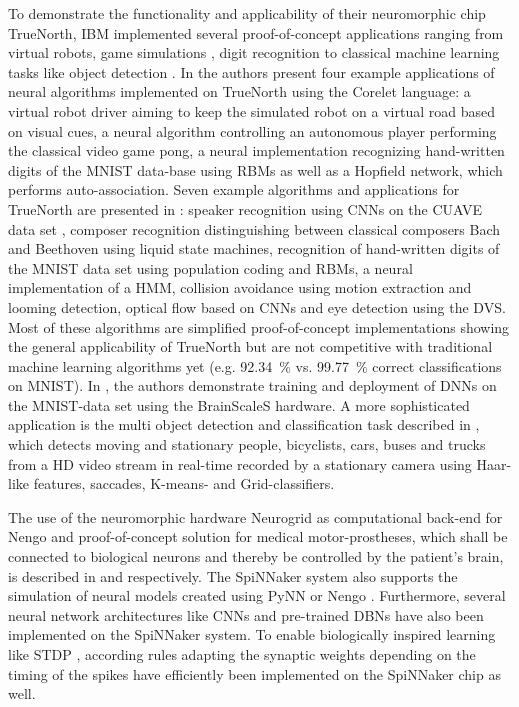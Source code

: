 To demonstrate the functionality and applicability of their neuromorphic chip TrueNorth, IBM implemented several proof-of-concept applications ranging from virtual robots, game simulations \cite{Arthur2012}, digit recognition \cite{Arthur2012, Esser2013} to classical machine learning tasks like object detection \cite{Akopyan2015}.
In \cite{Arthur2012} the authors present four example applications of neural algorithms implemented on TrueNorth using the Corelet language: a virtual robot driver aiming to keep the simulated robot on a virtual road based on visual cues, a neural algorithm controlling an autonomous player performing the classical video game pong, a neural implementation recognizing hand-written digits of the \ac{MNIST} data-base using \acp{RBM} as well as a Hopfield network, which performs auto-association.
Seven example algorithms and applications for TrueNorth are presented in \cite{Esser2013}: speaker recognition using \acp{CNN} on the \ac{CUAVE} data set \cite{Patterson2002}, composer recognition distinguishing between classical composers Bach and Beethoven using liquid state machines, recognition of hand-written digits of the \ac{MNIST} data set using population coding and \acp{RBM}, a neural implementation of a \ac{HMM}, collision avoidance using motion extraction and looming detection, optical flow based on \acp{CNN} and eye detection using the \ac{DVS}.
Most of these algorithms are simplified proof-of-concept implementations showing the general applicability of TrueNorth but are not competitive with traditional machine learning algorithms yet (e.g. \SI{92.34}{\percent} \cite{Esser2013} vs. \SI{99.77}{\percent} \cite{Ciresan2012a} correct classifications on \ac{MNIST}).
In \cite{Schmitt2017}, the authors demonstrate training and deployment of \acp{DNN} on the \ac{MNIST}-data set using the \ac{BrainScaleS} hardware.
A more sophisticated application is the multi object detection and classification task described in \cite{Akopyan2015}, which detects moving and stationary people, bicyclists, cars, buses and trucks from a HD video stream in real-time recorded by a stationary camera using Haar-like features, saccades, K-means- and Grid-classifiers.

The use of the neuromorphic hardware Neurogrid \cite{Benjamin2014} as computational back-end for \ac{Nengo} and proof-of-concept solution for medical motor-prostheses, which shall be connected to biological neurons and thereby be controlled by the patient's brain, is described in \cite{Choudhary2012} and \cite{Dethier2011} respectively.
The \ac{SpiNNaker} system \cite{Furber2014} also supports the simulation of neural models created using \ac{PyNN} or \ac{Nengo} \cite{Mundy2015}.
Furthermore, several neural network architectures like \acp{CNN} \cite{Serrano-Gotarredona2015} and pre-trained \acp{DBN} \cite{Stromatias2015, Stromatias2015a} have also been implemented on the \ac{SpiNNaker} system.
To enable biologically inspired learning like \ac{STDP} \cite{Bi2001}, according rules adapting the synaptic weights depending on the timing of the spikes have efficiently been implemented on the \ac{SpiNNaker} \cite{Diehl2014} chip as well.

